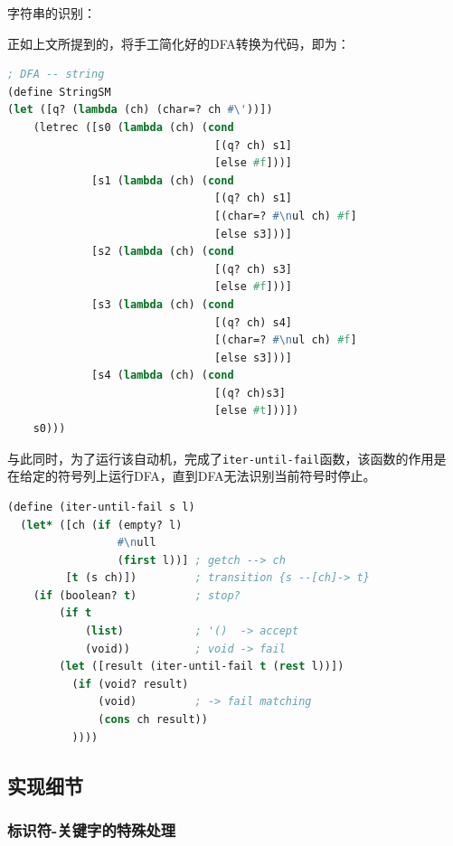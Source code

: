 \documentclass[lang=cn]{elegantpaper}
\begin{document}
\begin{example} 字符串的识别：

    正如上文所提到的，将手工简化好的DFA转换为代码，即为：

\begin{lstlisting}[language=lisp,caption=Racket-lang 实现-用于匹配字符串的DFA定义]
; DFA -- string
(define StringSM
(let ([q? (lambda (ch) (char=? ch #\'))])
    (letrec ([s0 (lambda (ch) (cond
                                [(q? ch) s1]
                                [else #f]))]
             [s1 (lambda (ch) (cond
                                [(q? ch) s1]
                                [(char=? #\nul ch) #f]
                                [else s3]))]
             [s2 (lambda (ch) (cond
                                [(q? ch) s3]
                                [else #f]))]
             [s3 (lambda (ch) (cond
                                [(q? ch) s4]
                                [(char=? #\nul ch) #f]
                                [else s3]))]
             [s4 (lambda (ch) (cond
                                [(q? ch)s3]
                                [else #t]))])
    s0)))
\end{lstlisting}

    与此同时，为了运行该自动机，完成了\lstinline|iter-until-fail|函数，该函数的作用是
    在给定的符号列上运行DFA，直到DFA无法识别当前符号时停止。

\begin{lstlisting}[language=lisp, caption=在给定的符号列上，运行该状态机]
(define (iter-until-fail s l)
  (let* ([ch (if (empty? l)
                 #\null
                 (first l))] ; getch --> ch
         [t (s ch)])         ; transition {s --[ch]-> t}
    (if (boolean? t)         ; stop?
        (if t
            (list)           ; '()  -> accept
            (void))          ; void -> fail
        (let ([result (iter-until-fail t (rest l))])
          (if (void? result)
              (void)         ; -> fail matching
              (cons ch result))
          ))))
    \end{lstlisting}
\end{example}

\subsection{实现细节}

\subsubsection{标识符-关键字的特殊处理}
\end{document}
